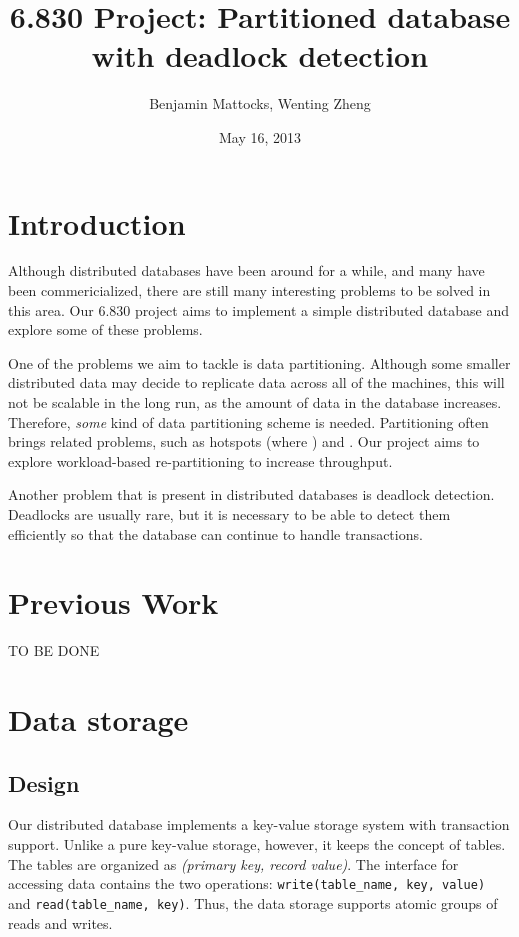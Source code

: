 \documentclass[a4paper, 10pt, notitlepage]{report}
\title{6.830 Project: Partitioned database with deadlock detection}
\author{Benjamin Mattocks, Wenting Zheng}
\date{May 16, 2013} %
\begin{document}
\maketitle
\thispagestyle{empty}
\newpage


\section*{Introduction}

Although distributed databases have been around for a while, and many have been commericialized, there are still many
interesting problems to be solved in this area. Our 6.830 project aims to implement a simple distributed database
and explore some of these problems.

One of the problems we aim to tackle is data partitioning. Although some smaller distributed data may decide to replicate
data across all of the machines, this will not be scalable in the long run, as the amount of data in the database
increases. Therefore, {\em some} kind of data partitioning scheme is needed. Partitioning often brings related problems, such
as hotspots (where ) and . Our project aims to explore workload-based re-partitioning to increase throughput.

Another problem that is present in distributed databases is deadlock detection. Deadlocks are usually rare, but it is necessary
to be able to detect them efficiently so that the database can continue to handle transactions.


\section*{Previous Work}

TO BE DONE

\section*{Data storage}

\subsection*{Design}
Our distributed database implements a key-value storage system with transaction support. Unlike a pure key-value storage, however,
it keeps the concept of tables. The tables are organized as {\em (primary key, record value)}.
The interface for accessing data contains the two operations: \texttt{write(table\_name, key, value)} and \texttt{read(table\_name, key)}.
Thus, the data storage supports atomic groups of reads and writes.
\end{document}
